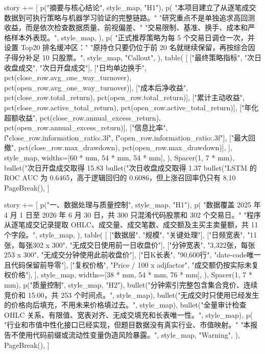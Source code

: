 \documentclass[UTF8,a4paper,fontset=fandol]{ctexart}
\begin{document}
\begin{ProjectCode}
{    story += [
        p("摘要与核心结论", style_map, "H1"),
        p(
            "本项目建立了从逐笔成交数据到可执行策略与机器学习验证的完整链路。"
            "研究重点不是单独追求高回测收益，而是依次检查数据质量、前视偏差、"
            "交易限制、基准、换手、成本和严格样本外表现。",
            style_map,
        ),
        p(
            "正式推荐策略为每 5 个交易日调仓一次，并设置 Top20 排名缓冲区："
            "原持仓只要仍位于前 20 名就继续保留，再按综合因子得分补足 10 只股票。",
            style_map,
            "Callout",
        ),
        table(
            [
                ["最终策略指标", "次日收盘成交", "次日开盘成交"],
                ["日均单边换手", pct(close_row.avg_one_way_turnover), pct(open_row.avg_one_way_turnover)],
                ["成本后净收益", pct(close_row.total_return), pct(open_row.total_return)],
                ["累计主动收益", pct(close_row.active_total_return), pct(open_row.active_total_return)],
                ["年化超额收益", pct(close_row.annual_excess_return), pct(open_row.annual_excess_return)],
                ["信息比率", f"{close_row.information_ratio:.3f}", f"{open_row.information_ratio:.3f}"],
                ["最大回撤", pct(close_row.max_drawdown), pct(open_row.max_drawdown)],
            ],
            style_map,
            widths=[60 * mm, 54 * mm, 54 * mm],
        ),
        Spacer(1, 7 * mm),
        bullet("次日开盘成交取得 15.83%
        bullet("次日收盘成交取得 1.37%
        bullet("LSTM 的 ROC AUC 为 0.6465，高于逻辑回归的 0.6086，但上涨召回率仍只有 8.10%
        PageBreak(),
    ]

    story += [
        p("一、数据处理与质量控制", style_map, "H1"),
        p(
            "数据覆盖 2025 年 4 月 1 日至 2026 年 6 月 30 日，共 300 只混淆代码股票和 302 个交易日。"
            "程序从逐笔成交记录提取 OHLC、成交量、成交笔数、成交额及主买主卖量额，共 11 个字段。",
            style_map,
        ),
        table(
            [
                ["数据层", "规模", "关键处理"],
                ["日频宽表", "11张，每张302 x 300", "无成交日使用前一日收盘价"],
                ["分钟宽表", "3,322张，每张253 x 300", "无成交分钟使用此前收盘价"],
                ["日K长表", "90,600行", "date-code唯一且代码保留前导零"],
                ["复权价格", "Price / 100 x adjfactor", "成交额仍按实际未复权价格"],
            ],
            style_map,
            widths=[38 * mm, 54 * mm, 76 * mm],
        ),
        Spacer(1, 7 * mm),
        p("质量控制", style_map, "H2"),
        bullet("分钟索引完整包含集合竞价、连续竞价和 15:00，共 253 个时间点。", style_map),
        bullet("无成交时只使用已经发生的价格向后填充，不用未来价格填过去。", style_map),
        bullet("全量审计检查 OHLC 关系、有限值、宽表对齐、无成交填充和长表唯一性。", style_map),
        p(
            "行业和市值中性化接口已经实现，但题目数据没有真实行业、市值映射。"
            "本报告不使用代码前缀或流动性变量伪造风险暴露。",
            style_map,
            "Warning",
        ),
        PageBreak(),
    ]

}
\end{ProjectCode}
\end{document}
